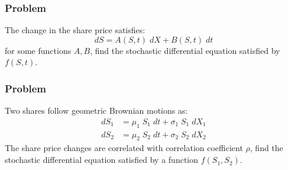 \subsubsection{Problem}
The change in the share price satisfies:
\begin{equation}
    dS = A(S,t) \; dX + B(S,t) \; dt
    \nonumber
\end{equation}
for some functions $A, B$, find the stochastic differential equation satisfied by $f(S,t)$.


\subsubsection{Problem}
Two shares follow geometric Brownian motions as:
\begin{align*}
    dS_1 &= \mu_1 \; S_1 \; dt + \sigma_1 \; S_1 \; dX_1 \\
    dS_2 &= \mu_2 \; S_2 \; dt + \sigma_2 \; S_2 \; dX_2     
\end{align*}
The share price changes are correlated with correlation coefficient $\rho$, find the stochastic differential equation satisfied by a function $f(S_1,S_2)$.

















